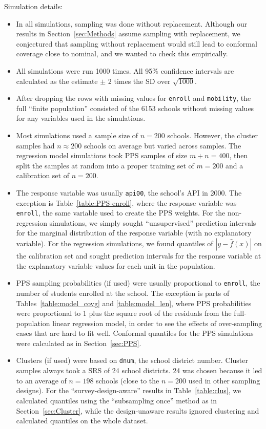 \documentclass[10.5pt, letterpaper]{article}
\numberwithin{table}{section}
\numberwithin{figure}{section}
\numberwithin{equation}{section}
\begin{document}
Simulation details:
\begin{itemize}
  \item In all simulations, sampling was done without replacement. Although our results in Section~\ref{sec:Methods} assume sampling with replacement, we conjectured that sampling without replacement would still lead to conformal coverage close to nominal, and we wanted to check this empirically.
  \item All simulations were run 1000 times. All 95\% confidence intervals are calculated as the estimate $\pm$ 2 times the SD over $\sqrt{1000}$.
  \item After dropping the rows with missing values for \texttt{enroll} and \texttt{mobility}, the full ``finite population'' consisted of the 6153 schools without missing values for any variables used in the simulations.
  \item Most simulations used a sample size of $n=200$ schools. However, the cluster samples had $n \approx 200$ schools on average but varied across samples. The regression model simulations took PPS samples of size $m+n=400$, then split the samples at random into a proper training set of $m=200$ and a calibration set of $n=200$.
  \item The response variable was usually \texttt{api00}, the school's API in 2000. The exception is Table~\ref{table:PPS-enroll}, where the response variable was \texttt{enroll}, the same variable used to create the PPS weights. For the non-regression simulations, we simply sought ``unsupervised'' prediction intervals for the marginal distribution of the response variable (with no explanatory variable). For the regression simulations, we found quantiles of $|y - \hat f(x)|$ on the calibration set and sought prediction intervals for the response variable at the explanatory variable values for each unit in the population.
  \item PPS sampling probabilities (if used) were usually proportional to \texttt{enroll}, the number of students enrolled at the school. The exception is parts of Tables~\ref{table:model_covg} and \ref{table:model_len}, where PPS probabilities were proportional to 1 plus the square root of the residuals from the full-population linear regression model, in order to see the effects of over-sampling cases that are hard to fit well. Conformal quantiles for the PPS simulations were calculated as in Section~\ref{sec:PPS}.
  \item Clusters (if used) were based on \texttt{dnum}, the school district number. Cluster samples always took a SRS of 24 school districts. 24 was chosen because it led to an average of $n=198$ schools (close to the $n=200$ used in other sampling designs). For the ``survey-design-aware'' results in Table~\ref{table:clus}, we calculated quantiles using the ``subsampling once'' method as in Section~\ref{sec:Cluster}, while the design-unaware results ignored clustering and calculated quantiles on the whole dataset.

\end{itemize}
\end{document}
